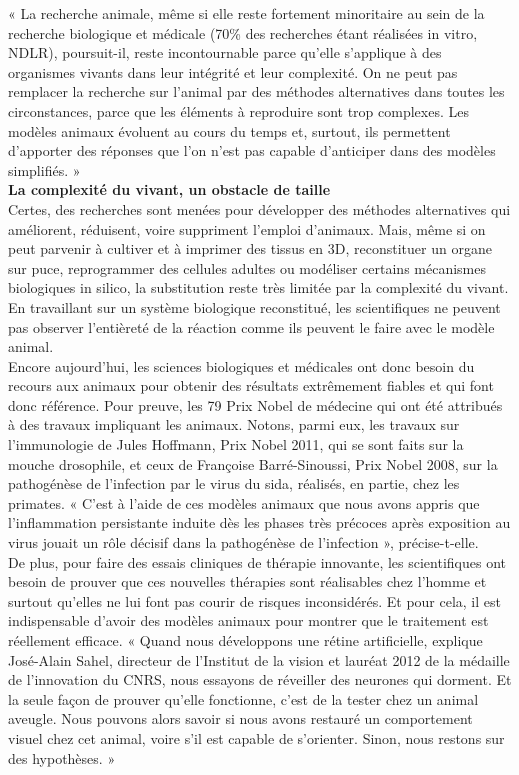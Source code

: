 \documentclass[8pt]{article}
\begin{document}
« La recherche animale, même si elle reste fortement minoritaire au sein de la recherche biologique et médicale (70\% des recherches étant réalisées in vitro, NDLR), poursuit-il, reste incontournable parce qu’elle s’applique à des organismes vivants dans leur intégrité et leur complexité. On ne peut pas remplacer la recherche sur l’animal par des méthodes alternatives dans toutes les circonstances, parce que les éléments à reproduire sont trop complexes. Les modèles animaux évoluent au cours du temps et, surtout, ils permettent d’apporter des réponses que l’on n’est pas capable d’anticiper dans des modèles simplifiés. »\\

\textbf{La complexité du vivant, un obstacle de taille}\\

Certes, des recherches sont menées pour développer des méthodes alternatives qui améliorent, réduisent, voire suppriment l’emploi d’animaux. Mais, même si on peut parvenir à cultiver et à imprimer des tissus en 3D, reconstituer un organe sur puce, reprogrammer des cellules adultes ou modéliser certains mécanismes biologiques in silico, la substitution reste très limitée par la complexité du vivant. En travaillant sur un système biologique reconstitué, les scientifiques ne peuvent pas observer l’entièreté de la réaction comme ils peuvent le faire avec le modèle animal.\\

Encore aujourd’hui, les sciences biologiques et médicales ont donc besoin du recours aux animaux pour obtenir des résultats extrêmement fiables et qui font donc référence. Pour preuve, les 79 Prix Nobel de médecine qui ont été attribués à des travaux impliquant les animaux. Notons, parmi eux, les travaux sur l’immunologie de Jules Hoffmann, Prix Nobel 2011, qui se sont faits sur la mouche drosophile, et ceux de Françoise Barré-Sinoussi, Prix Nobel 2008, sur la pathogénèse de l’infection par le virus du sida, réalisés, en partie, chez les primates. « C’est à l’aide de ces modèles animaux que nous avons appris que l’inflammation persistante induite dès les phases très précoces après exposition au virus jouait un rôle décisif dans la pathogénèse de l’infection », précise-t-elle.\\

De plus, pour faire des essais cliniques de thérapie innovante, les scientifiques ont besoin de prouver que ces nouvelles thérapies sont réalisables chez l’homme et surtout qu’elles ne lui font pas courir de risques inconsidérés. Et pour cela, il est indispensable d’avoir des modèles animaux pour montrer que le traitement est réellement efficace. « Quand nous développons une rétine artificielle, explique José-Alain Sahel, directeur de l’Institut de la vision et lauréat 2012 de la médaille de l’innovation du CNRS, nous essayons de réveiller des neurones qui dorment. Et la seule façon de prouver qu’elle fonctionne, c’est de la tester chez un animal aveugle. Nous pouvons alors savoir si nous avons restauré un comportement visuel chez cet animal, voire s’il est capable de s’orienter. Sinon, nous restons sur des hypothèses. »\\
\end{document}
